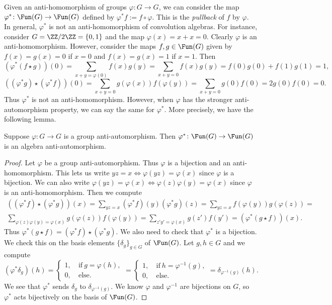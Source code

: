 Given an anti-homomorphism of groups $\varphi\colon G\to G$, we can consider the map $\varphi^\ast\colon\Fun(G)\to\Fun(G)$ defined by $\varphi^\ast f := f\circ \varphi$.
This is the \emph{pullback} of $f$ by $\varphi$.
In general, $\varphi^\ast$ is not an anti-homomorphism of convolution algebras.
For instance, consider $G=\ZZ/2\ZZ=\{0,1\}$ and the map $\varphi(x)=x+x=0$.
Clearly $\varphi$ is an anti-homomorphism.
However, consider the maps $f,g\in\Fun(G)$ given by $f(x)=g(x)=0$ if $x=0$ and $f(x)=g(x)=1$ if $x=1$.
Then
\[
	(\varphi^\ast(f\star g))(0) = \sum_{x+y = \varphi(0)} f(x)g(y) = \sum_{x+y = 0} f(x)g(y) = f(0)g(0) + f(1)g(1) = 1,
\]
\[
	((\varphi^\ast g)\star(\varphi^\ast f))(0) = \sum_{x+y = 0} g(\varphi(x))f(\varphi(y)) = \sum_{x+y = 0} g(0)f(0) = 2g(0)f(0) = 0.
\]
Thus $\varphi^\ast$ is not an anti-homomorphism.
However, when $\varphi$ has the stronger anti-automorphism property, we can say the same for $\varphi^\ast$.
More precisely, we have the following lemma.
\begin{lem}
	Suppose $\varphi\colon G\to G$ is a group anti-automorphism.
	Then $\varphi^\ast\colon\Fun(G)\to\Fun(G)$ is an algebra anti-automorphism.
\end{lem}
\begin{proof}
	Let $\varphi$ be a group anti-automorphism.
	Thus $\varphi$ is a bijection and an anti-homomorphism.
	This lets us write $yz=x \iff \varphi(yz)=\varphi(x)$ since $\varphi$ is a bijection.
	We can also write $\varphi(yz)=\varphi(x) \iff \varphi(z)\varphi(y)=\varphi(x)$ since $\varphi$ is an anti-homomorphism.
	Then we compute
	\begin{multline*}
		((\varphi^\ast f)\star(\varphi^\ast g))(x) = \sum_{yz=x} (\varphi^\ast f)(y)(\varphi^\ast g)(z) = \sum_{yz=x} f(\varphi(y)) g(\varphi(z)) = \\
		\sum_{\varphi(z)\varphi(y)=\varphi(x)} g(\varphi(z))f(\varphi(y)) = \sum_{z'y'=\varphi(x)} g(z')f(y') = (\varphi^\ast(g\star f))(x).
	\end{multline*}
	Thus $\varphi^\ast(g\star f) = (\varphi^\ast f)\star(\varphi^\ast g)$.
	We also need to check that $\varphi^\ast$ is a bijection.
	We check this on the basis elements $\{\delta_g\}_{g\in G}$ of $\Fun(G)$.
	Let $g,h\in G$ and we compute
	\[
		(\varphi^\ast\delta_g)(h) = \begin{cases}
			1,\  & \text{if}\ g=\varphi(h), \\
			0,\  & \text{else}.
		\end{cases} = \begin{cases}
			1,\  & \text{if}\ h=\varphi^{-1}(g), \\
			0,\  & \text{else}.
		\end{cases} = \delta_{\varphi^{-1}(g)}(h).
	\]
	We see that $\varphi^\ast$ sends $\delta_g$ to $\delta_{\varphi^{-1}(g)}$.
	We know $\varphi$ and $\varphi^{-1}$ are bijections on $G$, so $\varphi^\ast$ acts bijectively on the basis of $\Fun(G)$.
\end{proof}
